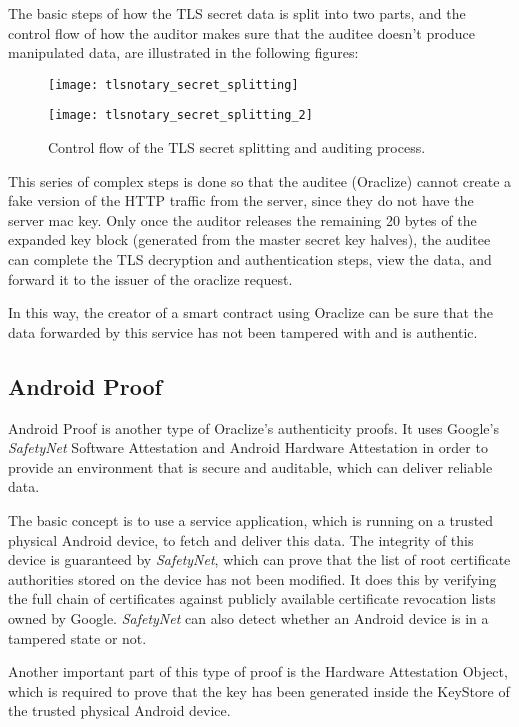The basic steps of how the TLS secret data is split into two parts, and the control flow of how the auditor makes sure that the auditee doesn't produce manipulated data, are illustrated in the following figures:

\begin{figure}[H]
\centering
\texttt{[image: tlsnotary\_secret\_splitting]}
\end{figure}
\begin{figure}[H]
\centering
\texttt{[image: tlsnotary\_secret\_splitting\_2]}
\caption{Control flow of the TLS secret splitting and auditing process. \cite{tlsnotarywhitepaper}}
\end{figure}

This series of complex steps is done so that the auditee (Oraclize) cannot create a fake version of the HTTP traffic from the server, since they do not have the server mac key. Only once the auditor releases the remaining 20 bytes of the expanded key block (generated from the master secret key halves), the auditee can complete the TLS decryption and authentication steps, view the data, and forward it to the issuer of the oraclize request. 

In this way, the creator of a smart contract using Oraclize can be sure that the data forwarded by this service has not been tampered with and is authentic.
\subsection*{Android Proof}
Android Proof is another type of Oraclize's authenticity proofs. It uses Google's \emph{SafetyNet} Software Attestation and Android Hardware Attestation in order to provide an environment that is secure and auditable, which can deliver reliable data.

The basic concept is to use a service application, which is running on a trusted physical Android device, to fetch and deliver this data. The integrity of this device is guaranteed by \emph{SafetyNet}, which can prove that the list of root certificate authorities stored on the device has not been modified. It does this by verifying the full chain of certificates against publicly available certificate revocation lists owned by Google. \emph{SafetyNet} can also detect whether an Android device is in a tampered state or not.

Another important part of this type of proof is the Hardware Attestation Object, which is required to prove that the key has been generated inside the KeyStore of the trusted physical Android device.

